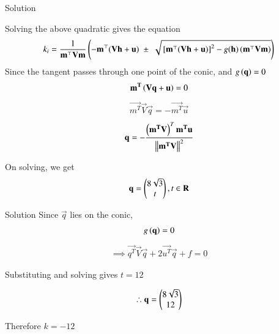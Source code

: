\documentclass{beamer}
\begin{document}
\begin{frame}{Solution}

Solving the above quadratic gives the equation
\begin{align}
k_i = \frac{1}{\mathbf{m}^{\top}\mathbf{V}\mathbf{m}}
\left(
    -\mathbf{m}^{\top} (\mathbf{V}\mathbf{h} + \mathbf{u})
    \;\pm\;
    \sqrt{ {}\left[\mathbf{m}^{\top}(\mathbf{V}\mathbf{h} + \mathbf{u})\right]^2
    - g(\mathbf{h}) \, (\mathbf{m}^{\top}\mathbf{V}\mathbf{m}) }
    \right)
\end{align}
Since the tangent passes through one point of the conic, and $g\left(\mathbf{q}\right)=0$
\begin{align}
\mathbf{m^T}\left(\mathbf{\mathbf{V}\mathbf{q} + \mathbf{u}}\right) = 0
\end{align}
\begin{align}
\vec{m^T}\vec{V}\vec{q} = -\vec{m^T}\vec{u}
\end{align}
\begin{align}
\mathbf{q} = -\frac{\left(\mathbf{m^T}\mathbf{V}\right)^T\mathbf{m^T}\mathbf{u}}{\left\lVert\mathbf{m^T}\mathbf{V}\right\rVert^2}
\end{align}

On solving, we get
\begin{align}
\mathbf{q} = \begin{pmatrix}8\sqrt{3} \\ t\end{pmatrix}, t \in \mathbf{R}
\end{align}
\end{frame}

\begin{frame}{Solution}
Since $\vec{q}$ lies on the conic, 
\begin{align}
g\left(\mathbf{\mathbf{q}}\right) = 0
\end{align}
\begin{align}
\implies \vec{q^T}\vec{V}\vec{q} + 2\vec{u^T}\vec{q} + f = 0
\end{align}

Substituting and solving gives $t=12$

\begin{align}
\therefore \mathbf{q} = \begin{pmatrix}8\sqrt{3} \\ 12\end{pmatrix}
\end{align}

Therefore $k = -12$    
\end{frame}
\end{document}
